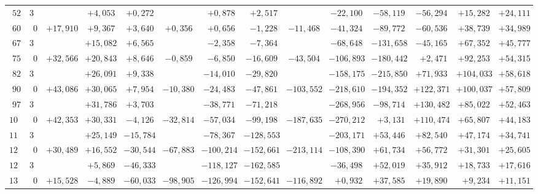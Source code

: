 \begin{landscape}
\begin{longtable}{@{}rr|r|r|r|r|r|r|r|r|r|r|r|r@{}}
\(52\) & \(30\) &  & \(+4{,}053\) & \(+0{,}272\) &  & \(+0{,}878\) & \(+2{,}517\) &  & \(-22{,}100\) & \(-58{,}119\) & \(-56{,}294\) & \(+15{,}282\) & \(+24{,}111\)\\[2pt]
\(60\) & \(0\) & \(+17{,}910\) & \(+9{,}367\) & \(+3{,}640\) & \(+0{,}356\) & \(+0{,}656\) & \(-1{,}228\) & \(-11{,}468\) & \(-41{,}324\) & \(-89{,}772\) & \(-60{,}536\) & \(+38{,}739\) & \(+34{,}989\)\\
\(67\) & \(30\) &  & \(+15{,}082\) & \(+6{,}565\) &  & \(-2{,}358\) & \(-7{,}364\) &  & \(-68{,}648\) & \(-131{,}658\) & \(-45{,}165\) & \(+67{,}352\) & \(+45{,}777\)\\
\(75\) & \(0\) & \(+32{,}566\) & \(+20{,}843\) & \(+8{,}646\) & \(-0{,}859\) & \(-6{,}850\) & \(-16{,}609\) & \(-43{,}504\) & \(-106{,}893\) & \(-180{,}442\) & \(+2{,}471\) & \(+92{,}253\) & \(+54{,}315\)\\
\(82\) & \(30\) &  & \(+26{,}091\) & \(+9{,}338\) &  & \(-14{,}010\) & \(-29{,}820\) &  & \(-158{,}175\) & \(-215{,}850\) & \(+71{,}933\) & \(+104{,}033\) & \(+58{,}618\)\\[2pt]
\(90\) & \(0\) & \(+43{,}086\) & \(+30{,}065\) & \(+7{,}954\) & \(-10{,}380\) & \(-24{,}483\) & \(-47{,}861\) & \(-103{,}552\) & \(-218{,}610\) & \(-194{,}352\) & \(+122{,}371\) & \(+100{,}037\) & \(+57{,}809\)\\
\(97\) & \(30\) &  & \(+31{,}786\) & \(+3{,}703\) &  & \(-38{,}771\) & \(-71{,}218\) &  & \(-268{,}956\) & \(-98{,}714\) & \(+130{,}482\) & \(+85{,}022\) & \(+52{,}463\)\\
\(105\) & \(0\) & \(+42{,}353\) & \(+30{,}331\) & \(-4{,}126\) & \(-32{,}814\) & \(-57{,}034\) & \(-99{,}198\) & \(-187{,}635\) & \(-270{,}212\) & \(+3{,}131\) & \(+110{,}474\) & \(+65{,}807\) & \(+44{,}183\)\\
\(112\) & \(30\) &  & \(+25{,}149\) & \(-15{,}784\) &  & \(-78{,}367\) & \(-128{,}553\) &  & \(-203{,}171\) & \(+53{,}446\) & \(+82{,}540\) & \(+47{,}174\) & \(+34{,}741\)\\[2pt]
\(120\) & \(0\) & \(+30{,}489\) & \(+16{,}552\) & \(-30{,}544\) & \(-67{,}883\) & \(-100{,}214\) & \(-152{,}661\) & \(-213{,}114\) & \(-108{,}390\) & \(+61{,}734\) & \(+56{,}772\) & \(+31{,}301\) & \(+25{,}605\)\\
\(127\) & \(30\) &  & \(+5{,}869\) & \(-46{,}333\) &  & \(-118{,}127\) & \(-162{,}585\) &  & \(-36{,}498\) & \(+52{,}019\) & \(+35{,}912\) & \(+18{,}733\) & \(+17{,}616\)\\
\(135\) & \(0\) & \(+15{,}528\) & \(-4{,}889\) & \(-60{,}033\) & \(-98{,}905\) & \(-126{,}994\) & \(-152{,}641\) & \(-116{,}892\) & \(+0{,}932\) & \(+37{,}585\) & \(+19{,}890\) & \(+9{,}234\) & \(+11{,}151\)\\

\end{longtable}
\end{landscape}
